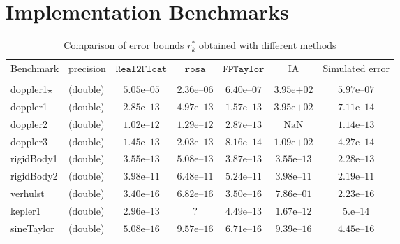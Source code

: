 \documentclass[a4paper,10pt]{article}
\newcommand{\nan}{\text{NaN}}
\newcommand{\realtofloat}{\mathtt{Real2Float}}
\newcommand{\rosa}{\mathtt{rosa}}
\newcommand{\fptaylor}{\mathtt{FPTaylor}}
\theoremstyle{plain}
\theoremstyle{definition}
\theoremstyle{remark}
\begin{document}
\section{Implementation Benchmarks} %
\label{sec:benchs}
\begin{table}[!ht]
\begin{center}
\caption{Comparison of error bounds $r_k^*$ obtained with different methods}
\begin{tabular}{p{2.3cm}lccccc}
\hline
\multirow{2}{*}{Benchmark} & \multirow{2}{*}{precision} & \multirow{2}{*}{$\realtofloat$} & $\rosa$  & $\fptaylor$  &\multirow{2}{*}{IA} & \multirow{2}{*}{Simulated error}
\\
& & & \cite{Darulova14Popl} & \cite{fptaylor15} & & \\
\hline            
\multirow{1}{*}{doppler1$\star$}
& (double) & $5.05\text{e--}05$ & $2.36\text{e--}06$ & $6.40\text{e--}07$ & $3.95\text{e+}02$ & $5.97\text{e--}07$\\
\multirow{1}{*}{doppler1}
& (double) & $2.85\text{e--}13$ & $4.97\text{e--}13$ & $1.57\text{e--}13$ & $3.95\text{e+}02$ & $7.11\text{e--}14$\\
\multirow{1}{*}{doppler2}
& (double) & $1.02\text{e--}12$ & $1.29\text{e--}12$ & $2.87\text{e--}13$ & $\nan$ & $1.14\text{e--}13$\\
\multirow{1}{*}{doppler3}
& (double) & $1.45\text{e--}13$ & $2.03\text{e--}13$ & $8.16\text{e--}14$ & $1.09\text{e+}02$ & $4.27\text{e--}14$\\
\multirow{1}{*}{rigidBody1}
& (double) & $3.55\text{e--}13$ & $5.08\text{e--}13$ & $3.87\text{e--}13$ & $3.55\text{e--}13$ & $2.28\text{e--}13$\\
\multirow{1}{*}{rigidBody2}
& (double) & $3.98\text{e--}11$ & $6.48\text{e--}11$ & $5.24\text{e--}11$ & $3.98\text{e--}11$ & $2.19\text{e--}11$\\
\multirow{1}{*}{verhulst}
& (double) & $3.40\text{e--}16$ & $6.82\text{e--}16$ & $3.50\text{e--}16$ & $7.86\text{e--}01$ & $2.23\text{e--}16$\\
\multirow{1}{*}{kepler1}
& (double) & $2.96\text{e--}13$ & ? & $4.49\text{e--}13$ & $1.67\text{e--}12$ & $5.\text{e--}14$\\
\hline
\multirow{2}{*}{sineTaylor}
& (double) & $5.08\text{e--}16$ & $9.57\text{e--}16$ & $6.71\text{e--}16$ & $9.39\text{e--}16$ & $4.45\text{e--}16$\\

\end{tabular}
\end{center}
\end{table}
\end{document}
